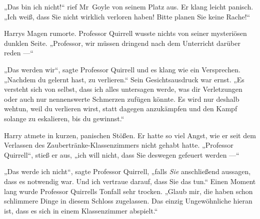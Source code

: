 „Das bin ich nicht!“ rief Mr~Goyle von seinem Platz aus. Er klang leicht panisch.
„Ich weiß, dass Sie nicht wirklich verloren haben! Bitte planen Sie keine Rache!“

Harrys Magen rumorte. Professor Quirrell wusste nichts von seiner mysteriösen dunklen Seite.
„Professor, wir müssen dringend nach dem Unterricht darüber reden —“

„Das werden wir“, sagte Professor Quirrell und es klang wie ein Versprechen.
„Nachdem du gelernt hast, zu verlieren.“ Sein Gesichtsausdruck war ernst.
„Es versteht sich von selbst, dass ich alles untersagen werde, was dir Verletzungen oder auch nur nennenswerte Schmerzen zufügen könnte. Es wird nur deshalb wehtun, weil du verlieren wirst, statt dagegen anzukämpfen und den Kampf solange zu eskalieren, bis du gewinnst.“

Harry atmete in kurzen, panischen Stößen. Er hatte so viel Angst, wie er seit dem Verlassen des Zaubertränke-Klassenzimmers nicht gehabt hatte.
„Professor Quirrell“, stieß er aus, „ich will nicht, dass Sie deswegen gefeuert werden —“

„Das werde ich nicht“, sagte Professor Quirrell, „falls \emph{Sie} anschließend aussagen, dass es notwendig war. Und ich vertraue darauf, dass Sie das tun.“ Einen Moment lang wurde Professor Quirrells Tonfall sehr trocken.
„Glaub mir, die haben schon schlimmere Dinge in diesem Schloss zugelassen. Das einzig Ungewöhnliche hieran ist, dass es sich in einem Klassenzimmer abspielt.“

